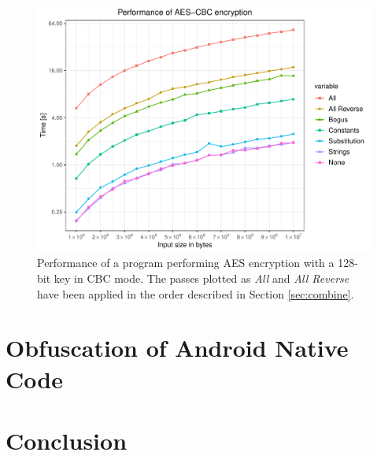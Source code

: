 \documentclass[
  digital, %
  notable,   %
  twoside, %
  nolof,     %
  nolot,     %
]{fithesis3}
\theoremstyle{definition}
\begin{document}
\begin{figure}[!h]
    \centering
    \includegraphics[width=\textwidth]{aes_bench.pdf}
    \caption{Performance of a program performing AES encryption with a 128-bit key in CBC mode. The passes plotted as \textit{All} and \textit{All Reverse} have been applied in the order described in Section \ref{sec:combine}.}
    \label{fig:aes_bench}
\end{figure}






\chapter{Obfuscation of Android Native Code}

\chapter{Conclusion}


\printbibliography[heading=bibintoc] %
\end{document}
